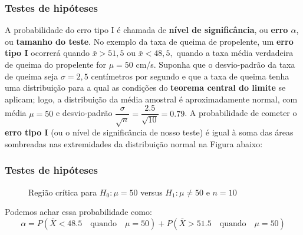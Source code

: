 \documentclass[14pt,aspectratio=1610]{beamer}
\newcommand{\bx}{\ensuremath{\bar{x}}}
\newcommand{\Ho}{\ensuremath{H_{0}}}
\newcommand{\Hi}{\ensuremath{H_{1}}}
\begin{document}
\begin{frame}{}
\frametitle{Testes de hipóteses}
\begin{block}{}
\justifying
A probabilidade do erro tipo I é chamada de \textbf{nível de significância}, ou \textbf{erro $\alpha$}, ou \textbf{tamanho do teste}. No exemplo da taxa de queima de 
propelente, um \textbf{erro tipo I} ocorrerá quando $ \bx> 51,5$ ou $\bx < 48,5,$ quando a taxa média verdadeira de queima do propelente for $\mu = 50$ cm/s. 
Suponha que o desvio-padrão da taxa de queima seja $\sigma = 2,5$ centímetros por segundo e que a taxa de queima tenha uma distribuição para a qual as condições do 
\textbf{teorema central do limite} se aplicam; logo, a distribuição da média amostral é aproximadamente normal, com média $\mu = 50$ e desvio-padrão 
$\dfrac{\sigma}{\sqrt{n}}=\dfrac{2.5}{\sqrt{10}}=0.79$. A probabilidade de cometer o \textbf{erro tipo I} (ou o nível de significância de nosso teste) é igual à soma das 
áreas sombreadas nas extremidades da distribuição normal na Figura abaixo:
\end{block}
\end{frame}

\begin{frame}{}
\frametitle{Testes de hipóteses}
\begin{block}{}
\begin{figure}
\centering
{}
\caption{Região crítica para $\Ho: \mu = 50$ versus $\Hi: \mu \neq 50$ e $n = 10$}
\end{figure}
\end{block}
\pause
\begin{block}{}
Podemos achar essa probabilidade como:
$$\alpha=P(\bar{X}<48.5\quad \textrm{quando}\quad \mu=50)+P(\bar{X}>51.5\quad \textrm{quando}\quad \mu=50)$$
\end{block}
\end{frame}
\end{document}

